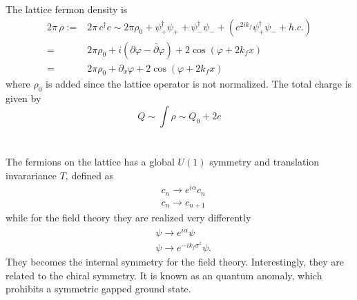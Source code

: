 The lattice fermon density is 
\begin{equation}
	\begin{aligned}
		2\pi\,\rho :=& 2\pi\,c^\dagger c \sim 2\pi \rho_0 + \psi_{+}^\dagger \psi_{+} + \psi_{-}^\dagger \psi_{-} + \left(e^{2i k_f}\psi_{+}^\dagger \psi_{-} + h.c. \right) \\
		=&  2\pi \rho_0 +  i \left(\partial \varphi - \bar{\partial} \varphi\right) + 2 \cos (\varphi + 2k_f x) \\
		=& 2\pi \rho_0 +  \partial_x \varphi + 2 \cos (\varphi + 2k_f x)
	\end{aligned}
\end{equation}
where $\rho_0$ is added since the lattice operator is not normalized. The total charge is given by 
\begin{equation}
	Q \sim \int \rho \sim Q_0 + 2e
\end{equation}
\\

 \\
The fermions on the lattice has a global $U(1)$ symmetry and translation invarariance $T$, defined as
\begin{equation}
	\begin{aligned}
		&c_n \rightarrow e^{i\alpha} c_n \\
		&c_n \rightarrow c_{n+1}
	\end{aligned}
\end{equation} 
while for the field theory they are realized very differently
\begin{equation}
	\begin{aligned}
		&\psi \rightarrow e^{i\alpha} \psi \\
		&\psi \rightarrow e^{-i k_f \sigma^z}\psi.
	\end{aligned}
\end{equation} 
They becomes the internal symmetry for the field theory. Interestingly, they are related to the chiral symmetry. It is known as an quantum anomaly, which prohibits a symmetric gapped ground state.  \\


